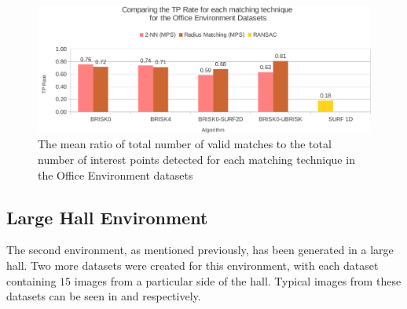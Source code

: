 \documentclass[11pt]{report}
\begin{document}
%

\begin{figure}
  \centering
    \includegraphics[width=1.0\textwidth]{../Drawings/Graphs/tp_rate_oe.pdf}
    \caption{The mean ratio of total number of valid matches to the total number of interest points detected for each matching technique in the Office Environment datasets} 
    \label{fig:tp_rate_oe}
\end{figure}


\subsection{Large Hall Environment}
\label{sec:largeHall}
The second environment, as mentioned previously, has been generated in a large hall. Two more datasets were created for this environment, with each dataset containing $15$ images from a particular side of the hall. Typical images from these datasets can be seen in  and  respectively.\\ 
\end{document}
